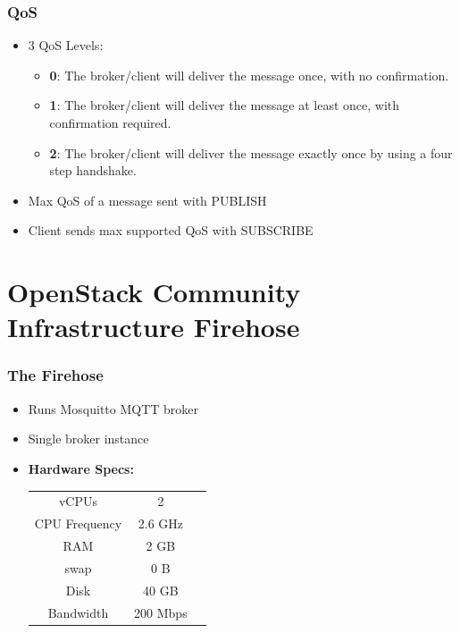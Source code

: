 \documentclass[aspectratio=169,11pt,hyperref={colorlinks=true}]{beamer}
\begin{document}
\begin{frame}
    \frametitle{QoS}
    \begin{itemize}
        \item 3 QoS Levels:\\
            \begin{itemize}
                \item \textbf{0}: The broker/client will deliver the message once, with no confirmation.
                \item \textbf{1}: The broker/client will deliver the message at least once, with confirmation required.
                \item \textbf{2}: The broker/client will deliver the message exactly once by using a four step handshake.
            \end{itemize}
        \item Max QoS of a message sent with PUBLISH
        \item Client sends max supported QoS with SUBSCRIBE
    \end{itemize}
\end{frame}




\section{OpenStack Community Infrastructure Firehose}
\begin{frame}
    \frametitle{The Firehose}
    \begin{itemize}
        \item Runs Mosquitto MQTT broker
        \item Single broker instance
        \item \textbf{Hardware Specs:}
        \begin{center}
            \begin{tabular}{ccc}
                \hline
                vCPUs & 2 \\
                CPU Frequency & 2.6 GHz \\
                RAM & 2 GB \\
                swap  & 0 B \\
                Disk & 40 GB \\
                Bandwidth & 200 Mbps \\
                \hline
            \end{tabular}
        \end{center}
    \end{itemize}
\end{frame}
\end{document}
